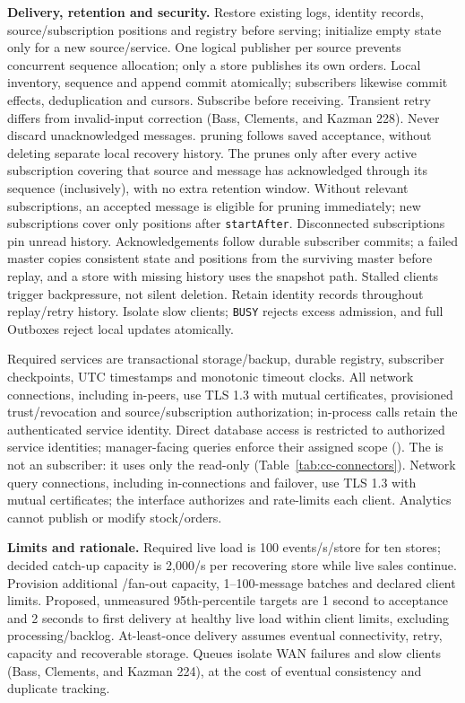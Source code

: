 \textbf{Delivery, retention and security.} Restore existing logs, identity records,
source/subscription positions and registry before serving; initialize empty state only for a new source/service.
One logical publisher per source prevents concurrent sequence allocation; only a store
publishes its own orders. Local inventory, sequence and \Outbox append commit atomically;
subscribers likewise commit effects, deduplication and cursors. Subscribe before receiving.
Transient retry differs from invalid-input correction (Bass, Clements, and Kazman 228).
Never discard unacknowledged messages. \Outbox pruning follows saved \CFE acceptance,
without deleting separate local recovery history. The \CFE prunes only after every
active subscription covering that source and message has acknowledged through its
sequence (inclusively), with no extra retention window. Without relevant subscriptions,
an accepted message is eligible for pruning immediately; new subscriptions cover
only positions after \texttt{startAfter}. Disconnected subscriptions pin unread history.
Acknowledgements follow durable subscriber commits; a failed master copies consistent
state and positions from the surviving master before replay, and a store with missing
history uses the snapshot path. Stalled clients trigger backpressure, not silent deletion.
Retain identity records throughout replay/retry history. Isolate slow clients;
\texttt{BUSY} rejects excess admission, and full Outboxes reject local updates atomically.

Required services are transactional storage/backup, durable registry, subscriber
checkpoints, UTC timestamps and monotonic timeout clocks. All network \IEP connections,
including in-\DC peers, use TLS 1.3 with mutual certificates, provisioned trust/revocation
and source/subscription authorization; in-process calls retain the authenticated
service identity. Direct database access is restricted to authorized service identities;
manager-facing queries enforce their assigned scope ().
The \AnalyticsClient is not an \IEP subscriber: it uses only the read-only
\InventoryQuery (Table~\ref{tab:cc-connectors}). Network query connections, including
in-\DC connections and failover, use TLS 1.3 with mutual certificates; the interface
authorizes and rate-limits each client. Analytics cannot publish or modify stock/orders.

\textbf{Limits and rationale.} Required live load is 100 events/s/store for ten stores;
decided catch-up capacity is 2{,}000/s per recovering store while live sales continue.
Provision additional \DC/fan-out capacity, 1--100-message batches and declared client
limits. Proposed, unmeasured 95th-percentile targets are 1 second to acceptance and
2 seconds to first delivery at healthy live load within client limits, excluding
processing/backlog. At-least-once delivery assumes eventual connectivity, retry,
capacity and recoverable storage. Queues isolate WAN failures and slow clients
(Bass, Clements, and Kazman 224), at the cost of eventual consistency and duplicate tracking.

